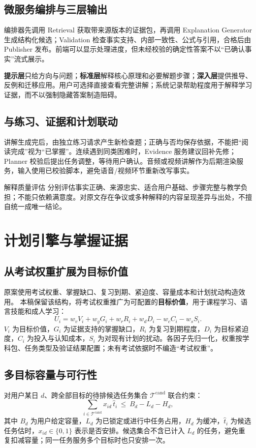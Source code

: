 \documentclass[UTF8,a4paper,11pt,fontset=none]{ctexart}
\newcommand{\newsec}[1]{\clearpage\section{#1}}
\begin{document}
\subsection{微服务编排与三层输出}
编排器先调用 Retrieval 获取带来源版本的证据包，再调用 Explanation Generator 生成结构化候选；Validation 检查事实支持、内部一致性、公式与引用，合格后由 Publisher 发布。前端可以显示处理进度，但未经校验的确定性答案不以“已确认事实”流式展示。

\textbf{提示层}只给方向与问题；\textbf{标准层}解释核心原理和必要解题步骤；\textbf{深入层}提供推导、反例和迁移应用。用户可选择直接查看完整讲解；系统记录帮助程度用于解释学习证据，而不以强制隐藏答案制造阻碍。

\subsection{与练习、证据和计划联动}
讲解生成完后，由独立练习请求产生新检查题；正确与否均保存依据，不能把“阅读完成”视为“已掌握”。连续遇到同类困难时，Evidence 服务建议回补先修；Planner 校验后提出任务调整，等待用户确认。音频或视频讲解作为后期渲染服务，输入使用已校验脚本，避免语音/视频环节重新改写事实。

\begin{caution}{解释质量评估}
分别评估事实正确、来源忠实、适合用户基础、步骤完整与教学负担；不能只依赖满意度。对原文存在争议或多种解释的内容呈现差异与出处，不擅自统一成唯一结论。
\end{caution}

\newsec{计划引擎与掌握证据}
\subsection{从考试权重扩展为目标价值}
原案使用考试权重、掌握缺口、复习到期、紧迫度、容量成本和计划扰动构造效用。\cite{original} 本稿保留该结构，将考试权重推广为可配置的\textbf{目标价值}，用于课程学习、语言技能和成人学习：
\[
U_i=w_vV_i+w_gG_i+w_rR_i+w_dD_i-w_cC_i-w_sS_i.
\]
$V_i$ 为目标价值，$G_i$ 为证据支持的掌握缺口，$R_i$ 为复习到期程度，$D_i$ 为目标紧迫度，$C_i$ 为投入与认知成本，$S_i$ 为对现有计划的扰动。各因子先归一化，权重按学科包、任务类型及验证结果配置；未有考试依据时不编造“考试权重”。

\subsection{多目标容量与可行性}
对用户某日 $d$、跨全部目标的待排候选任务集合 $\mathcal{T}^{\mathrm{cand}}$ 联合约束：
\[
\sum_{i\in\mathcal{T}^{\mathrm{cand}}}x_{id}\,\widehat t_i\ \leq\ B_d-L_d-H_d,
\]
其中 $B_d$ 为用户给定容量，$L_d$ 为已锁定或进行中任务占用，$H_d$ 为缓冲，$\widehat t_i$ 为候选任务估时，$x_{id}\in\{0,1\}$ 表示是否安排。候选集合不含已计入 $L_d$ 的任务，避免重复扣减容量；同一任务服务多个目标时也只安排一次。
\end{document}
